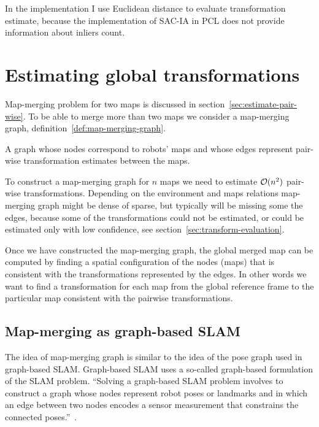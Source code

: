In the implementation I use Euclidean distance to evaluate transformation estimate, because the implementation of \gls{SAC-IA} in \gls{PCL} does not provide information about inliers count.


\section{Estimating global transformations}
\label{sec:estimate-global}

Map-merging problem for two maps is discussed in section~\ref{sec:estimate-pair-wise}. To be able to merge more than two maps we consider a map-merging graph, definition~\ref{def:map-merging-graph}.

\begin{defn}
    \label{def:map-merging-graph}
    A graph whose nodes correspond to robots' maps and whose edges represent pair-wise transformation estimates between the maps.
\end{defn}

To construct a map-merging graph for $n$ maps we need to estimate $\operatorname{\mathcal{O}}(n^2)$ pair-wise transformations. Depending on the environment and maps relations map-merging graph might be dense of sparse, but typically will be missing some the edges, because some of the transformations could not be estimated, or could be estimated only with low confidence, see section~\ref{sec:transform-evaluation}.

Once we have constructed the map-merging graph, the global merged map can be computed by finding a spatial configuration of the nodes (maps) that is consistent with the transformations represented by the edges. In other words we want to find a transformation for each map from the global reference frame to the particular map consistent with the pairwise transformations.

\subsection{Map-merging as graph-based SLAM}

The idea of map-merging graph is similar to the idea of the pose graph used in graph-based \gls{SLAM}. Graph-based \gls{SLAM} uses a so-called graph-based formulation of the \gls{SLAM} problem. ``Solving a graph-based \gls{SLAM} problem involves to construct a graph whose nodes represent robot poses or landmarks and in which an edge between two nodes encodes a sensor measurement that constrains the connected poses.''~\citep{grisetti2010tutorial}.

